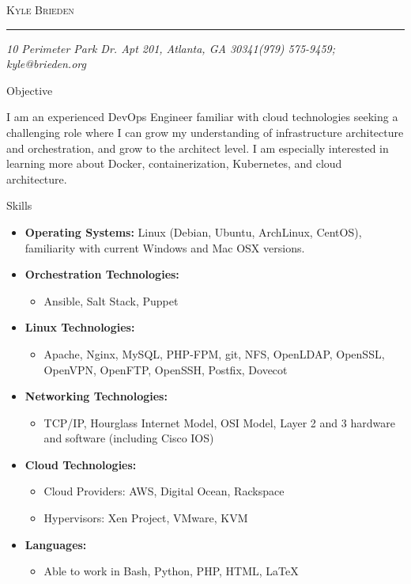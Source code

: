 \documentclass[10pt,oneside]{article}
\makeatletter
\newcommand{\name}{Kyle Brieden}
\newcommand{\addr}{10 Perimeter Park Dr. Apt 201, Atlanta, GA 30341}
\newcommand{\phone}{(979) 575-9459}
\newcommand{\email}{kyle@brieden.org}
\newcommand{\bigname}[1]{
    \begin{center}\fontfamily{phv}\selectfont\Huge\scshape#1\end{center}
}
\newenvironment{ressection}[1]{
    \vspace{4pt}
    {\fontfamily{phv}\selectfont\Large#1}
    \begin{itemize}
    \vspace{3pt}
}{
    \end{itemize}
}
\newcommand{\resitem}[1]{
    \vspace{-4pt}
    \item \begin{flushleft} #1 \end{flushleft}
}
\newcommand{\ressubitem}[1]{
    \vspace{-1pt}
    \item \begin{flushleft} #1 \end{flushleft}
}
\newenvironment{reslist}[1]{
    \resitem{\textbf{#1}}
    \vspace{-5pt}
    \begin{itemize}
}{
    \end{itemize}
}
\makeatother
\begin{document}
 \selectfont

\bigname{\name}

\vspace{-8pt} \rule{\textwidth}{1pt}

\vspace{-1pt} {\small\itshape \addr \hfill \phone; \email}

\vspace{8 pt}




\begin{ressection}{Objective}

    \begin{resobj}{I am an experienced DevOps Engineer familiar with cloud technologies seeking a challenging role where I can grow my understanding of infrastructure architecture and orchestration, and grow to the architect level.  I am especially interested in learning more about Docker, containerization, Kubernetes, and cloud architecture.}
   \end{resobj}

\end{ressection}
\begin{ressection}{Skills}

    \resitem{\textbf{Operating Systems:} Linux (Debian, Ubuntu, ArchLinux, CentOS), familiarity with current Windows and Mac OSX versions.}

    \begin{reslist}{Orchestration Technologies:}
        \ressubitem{Ansible, Salt Stack, Puppet}
    \end{reslist}

    \begin{reslist}{Linux Technologies:}
        \ressubitem{Apache, Nginx, MySQL, PHP-FPM, git, NFS, OpenLDAP, OpenSSL, OpenVPN, OpenFTP, OpenSSH, Postfix, Dovecot}
    \end{reslist}

    \begin{reslist}{Networking Technologies:}
        \ressubitem{TCP/IP, Hourglass Internet Model, OSI Model, Layer 2 and 3 hardware and software (including Cisco IOS)}
    \end{reslist}

    \begin{reslist}{Cloud Technologies:}
		\ressubitem{Cloud Providers:  AWS, Digital Ocean, Rackspace}
        \ressubitem{Hypervisors:  Xen Project, VMware, KVM}
    \end{reslist}

    \begin{reslist}{Languages:}

        \ressubitem{Able to work in Bash, Python, PHP, HTML, \LaTeX\ }

    \end{reslist}

\end{ressection}
\end{document}

